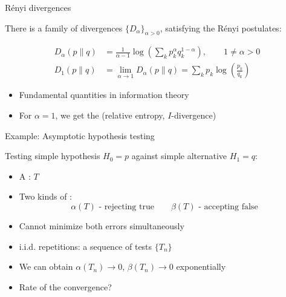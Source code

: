 \documentclass[mathserif]{beamer}
\newcommand{\<}{\langle}
\renewcommand{\>}{\rangle}
\begin{document}
\begin{frame}{R\'enyi divergences}

There is a  family of divergences $\{D_\alpha\}_{\alpha>0}$,
satisfying the {R\'enyi postulates}:

\begin{align*}
D_\alpha(p\|q)&=\frac1{\alpha-1}\log\left(\sum_k p_k^\alpha q_k^{1-\alpha}\right), \qquad 1\ne
\alpha>0\\
D_1(p\|q)&=\lim_{\alpha\to 1} D_\alpha(p\|q)=\sum_k p_k\log\left(\frac{p_k}{q_k}\right)
\end{align*}

\medskip


\begin{itemize}

\item Fundamental quantities in information theory

\item For $\alpha=1$, we get the   (relative entropy,
$I$-divergence)

\end{itemize}


\end{frame}


\begin{frame}{Example: Asymptotic hypothesis testing}

Testing simple hypothesis $H_0=p$ against simple alternative $H_1=q$:

\bigskip

\begin{itemize}
\item A : $T$
\vskip 3mm
\item Two kinds of :
\[
\alpha(T) \text{ - rejecting true} \qquad \beta(T)\text{ - accepting false}
\]
\item Cannot minimize both errors simultaneously
\vskip 3mm
\item i.i.d. repetitions: a sequence of tests $\{T_n\}$
\vskip 3mm
\item We can obtain $\alpha(T_n)\to 0$, $\beta(T_n)\to 0$ exponentially
\vskip 3mm
\item Rate of the convergence?
\end{itemize}




\end{frame}
\end{document}

